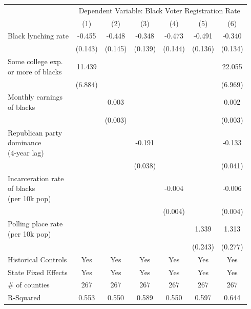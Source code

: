 {
\def\sym#1{\ifmmode^{#1}\else\(^{#1}\)\fi}
\begin{tabular}{l*{6}{c}}
\hline\hline
                    &\multicolumn{6}{c}{Dependent Variable: Black Voter Registration Rate}        \\
                    &         (1)&         (2)&         (3)&         (4)&         (5)&         (6)\\
\hline
Black lynching rate &      -0.455&      -0.448&      -0.348&      -0.473&      -0.491&      -0.340\\
                    &     (0.143)&     (0.145)&     (0.139)&     (0.144)&     (0.136)&     (0.134)\\
\makecell{Some college exp.\\or more of blacks}&      11.439&            &            &            &            &      22.055\\
                    &     (6.884)&            &            &            &            &     (6.969)\\
\makecell{Monthly earnings\\of blacks}&            &       0.003&            &            &            &       0.002\\
                    &            &     (0.003)&            &            &            &     (0.003)\\
\makecell{Republican party\\dominance\\(4-year lag)}&            &            &      -0.191&            &            &      -0.133\\
                    &            &            &     (0.038)&            &            &     (0.041)\\
\makecell{Incarceration rate\\of blacks\\(per 10k pop)}&            &            &            &      -0.004&            &      -0.006\\
                    &            &            &            &     (0.004)&            &     (0.004)\\
\makecell{Polling place rate\\(per 10k pop)}&            &            &            &            &       1.339&       1.313\\
                    &            &            &            &            &     (0.243)&     (0.277)\\
Historical Controls &         Yes&         Yes&         Yes&         Yes&         Yes&         Yes\\
State Fixed Effects &         Yes&         Yes&         Yes&         Yes&         Yes&         Yes\\
\hline
\# of counties      &         267&         267&         267&         267&         267&         267\\
R-Squared           &       0.553&       0.550&       0.589&       0.550&       0.597&       0.644\\
\hline\hline
\end{tabular}
}
